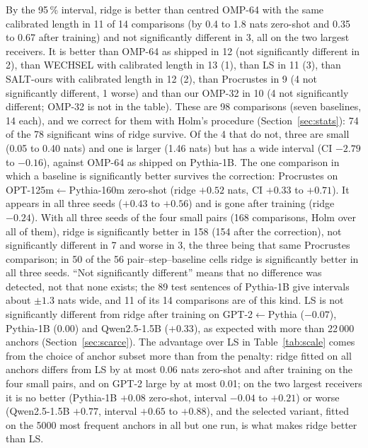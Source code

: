 \documentclass[preprint,12pt]{elsarticle}
\begin{document}
By the 95\,\% interval, ridge is better than centred OMP-64 with the same calibrated length in 11 of 14 comparisons (by 0.4 to 1.8 nats zero-shot and 0.35 to 0.67 after training) and not significantly different in 3, all on the two largest receivers. It is better than OMP-64 as shipped in 12 (not significantly different in 2), than WECHSEL with calibrated length in 13 (1), than LS in 11 (3), than SALT-ours with calibrated length in 12 (2), than Procrustes in 9 (4 not significantly different, 1 worse) and than our OMP-32 in 10 (4 not significantly different; OMP-32 is not in the table). These are 98 comparisons (seven baselines, 14 each), and we correct for them with Holm's procedure (Section~\ref{sec:stats}): 74 of the 78 significant wins of ridge survive. Of the 4 that do not, three are small (0.05 to 0.40 nats) and one is larger (1.46 nats) but has a wide interval (CI $-2.79$ to $-0.16$), against OMP-64 as shipped on Pythia-1B. The one comparison in which a baseline is significantly better survives the correction: Procrustes on OPT-125m$\leftarrow$Pythia-160m zero-shot (ridge $+0.52$ nats, CI $+0.33$ to $+0.71$). It appears in all three seeds ($+0.43$ to $+0.56$) and is gone after training (ridge $-0.24$). With all three seeds of the four small pairs (168 comparisons, Holm over all of them), ridge is significantly better in 158 (154 after the correction), not significantly different in 7 and worse in 3, the three being that same Procrustes comparison; in 50 of the 56 pair--step--baseline cells ridge is significantly better in all three seeds. ``Not significantly different'' means that no difference was detected, not that none exists; the 89 test sentences of Pythia-1B give intervals about $\pm1.3$ nats wide, and 11 of its 14 comparisons are of this kind. LS is not significantly different from ridge after training on GPT-2$\leftarrow$Pythia ($-0.07$), Pythia-1B ($0.00$) and Qwen2.5-1.5B ($+0.33$), as expected with more than 22\,000 anchors (Section~\ref{sec:scarce}). The advantage over LS in Table~\ref{tab:scale} comes from the choice of anchor subset more than from the penalty: ridge fitted on all anchors differs from LS by at most 0.06 nats zero-shot and after training on the four small pairs, and on GPT-2 large by at most 0.01; on the two largest receivers it is no better (Pythia-1B $+0.08$ zero-shot, interval $-0.04$ to $+0.21$) or worse (Qwen2.5-1.5B $+0.77$, interval $+0.65$ to $+0.88$), and the selected variant, fitted on the 5000 most frequent anchors in all but one run, is what makes ridge better than LS.
\end{document}
